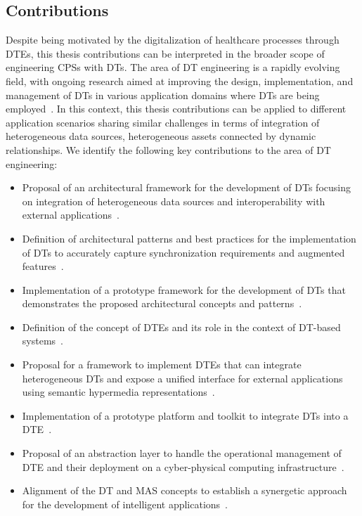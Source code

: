 \subsection*{Contributions}

Despite being motivated by the digitalization of healthcare processes through \acp{DTE}, this thesis contributions can be interpreted in the broader scope of engineering \acp{CPS} with \acp{DT}.
%
The area of \ac{DT} engineering is a rapidly evolving field, with ongoing research aimed at improving the design, implementation, and management of \acp{DT} in various application domains where \acp{DT} are being employed~\missingref{}.
%
In this context, this thesis contributions can be applied to different application scenarios sharing similar challenges in terms of integration of heterogeneous data sources, heterogeneous assets connected by dynamic relationships.
We identify the following key contributions to the area of \ac{DT} engineering:
\begin{itemize}
  \item Proposal of an architectural framework for the development of \acp{DT} focusing on integration of heterogeneous data sources and interoperability with external applications~\missingref{}.
  \item Definition of architectural patterns and best practices for the implementation of \acp{DT} to accurately capture synchronization requirements and augmented features~\missingref{}.
  \item Implementation of a prototype framework for the development of \acp{DT} that demonstrates the proposed architectural concepts and patterns~\missingref{}.
  \item Definition of the concept of \acp{DTE} and its role in the context of \ac{DT}-based systems~\missingref{}.
  \item Proposal for a framework to implement \acp{DTE} that can integrate heterogeneous \acp{DT} and expose a unified interface for external applications using semantic hypermedia representations~\missingref{}.
  \item Implementation of a prototype platform and toolkit to integrate \acp{DT} into a \ac{DTE}~\missingref{}.
  \item Proposal of an abstraction layer to handle the operational management of \ac{DTE} and their deployment on a cyber-physical computing infrastructure~\missingref{}.
  \item Alignment of the \ac{DT} and \ac{MAS} concepts to establish a synergetic approach for the development of intelligent applications~\missingref{}.
\end{itemize}

